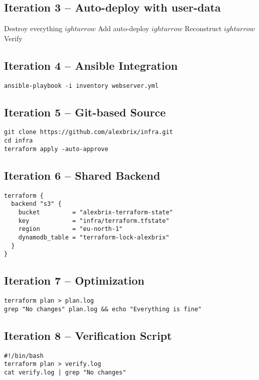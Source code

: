 \documentclass{article}
\begin{document}
\subsection{Iteration 3 – Auto-deploy with user-data}
Destroy everything $
ightarrow$ Add auto-deploy $
ightarrow$ Reconstruct $
ightarrow$ Verify

\subsection{Iteration 4 – Ansible Integration}
\begin{verbatim}
ansible-playbook -i inventory webserver.yml
\end{verbatim}

\subsection{Iteration 5 – Git-based Source}
\begin{verbatim}
git clone https://github.com/alexbrix/infra.git
cd infra
terraform apply -auto-approve
\end{verbatim}

\subsection{Iteration 6 – Shared Backend}
\begin{verbatim}
terraform {
  backend "s3" {
    bucket         = "alexbrix-terraform-state"
    key            = "infra/terraform.tfstate"
    region         = "eu-north-1"
    dynamodb_table = "terraform-lock-alexbrix"
  }
}
\end{verbatim}

\subsection{Iteration 7 – Optimization}
\begin{verbatim}
terraform plan > plan.log
grep "No changes" plan.log && echo "Everything is fine"
\end{verbatim}

\subsection{Iteration 8 – Verification Script}
\begin{verbatim}
#!/bin/bash
terraform plan > verify.log
cat verify.log | grep "No changes"
\end{verbatim}
\end{document}
